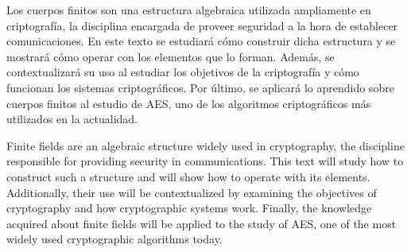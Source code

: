Los cuerpos finitos son una estructura algebraica utilizada ampliamente en criptografía, la disciplina encargada de proveer seguridad a la hora de establecer comunicaciones. En este texto se estudiará cómo construir dicha estructura y se mostrará cómo operar con los elementos que lo forman. Además, se contextualizará su uso al estudiar los objetivos de la criptografía y cómo funcionan los sistemas criptográficos. Por último, se aplicará lo aprendido sobre cuerpos finitos al estudio de AES, uno de los algoritmos criptográficos más utilizados en la actualidad.

\vspace{5em}

Finite fields are an algebraic structure widely used in cryptography, the discipline responsible for providing security in communications. This text will study how to construct such a structure and will show how to operate with its elements. Additionally, their use will be contextualized by examining the objectives of cryptography and how cryptographic systems work. Finally, the knowledge acquired about finite fields will be applied to the study of AES, one of the most widely used cryptographic algorithms today.